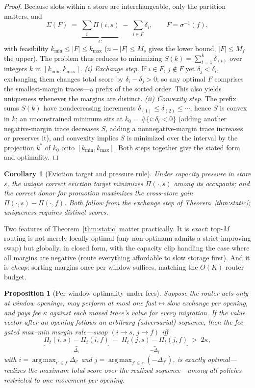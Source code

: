 \documentclass[10pt,twocolumn]{article}
\newtheorem{proposition}{Proposition}
\newtheorem{corollary}{Corollary}
\theoremstyle{definition}
\DeclareMathOperator{\argmax}{arg\,max}
\begin{document}
\begin{proof}
Because slots within a store are interchangeable, only the partition matters, and
\[
\Sigma(F)\;=\;\underbrace{\textstyle\sum_{i}\Pi(i,s)}_{C}\;-\;\sum_{i\in F}\delta_i ,
\qquad F=\sigma^{-1}(f),
\]
with feasibility $k_{\min}\le |F|\le k_{\max}$ ($n-|F|\le M_s$ gives the lower bound,
$|F|\le M_f$ the upper). The problem thus reduces to minimizing $S(k)=\sum_{t=1}^{k}\delta_{(t)}$ over
integers $k$ in $[k_{\min},k_{\max}]$. \emph{(i) Exchange step.} If $i\in F$, $j\notin F$ yet
$\delta_j<\delta_i$, exchanging them changes total score by $\delta_i-\delta_j>0$; so any optimal $F$
comprises the smallest-margin traces---a prefix of the sorted order. This also yields uniqueness whenever
the margins are distinct. \emph{(ii) Convexity step.} The prefix sums $S(k)$ have nondecreasing increments
$\delta_{(1)}\le\delta_{(2)}\le\cdots$, hence $S$ is convex in $k$; an unconstrained minimum sits at
$k_0=\#\{i:\delta_i<0\}$ (adding another negative-margin trace decreases $S$, adding a nonnegative-margin
trace increases or preserves it), and convexity implies $S$ is minimized over the interval by the projection
$k^{\ast}$ of $k_0$ onto $[k_{\min},k_{\max}]$. Both steps together give the stated form and optimality.
\end{proof}

\begin{corollary}[Eviction target and pressure rule]\label{cor:evict}
Under capacity pressure in store $s$, the unique correct eviction target minimizes $\Pi(\cdot,s)$ among its
occupants; and the correct donor for promotion maximizes the cross-store gain
$\Pi(\cdot,s)-\Pi(\cdot,f)$. Both follow from the exchange step of Theorem~\ref{thm:static}; uniqueness
requires distinct scores.
\end{corollary}

Two features of Theorem~\ref{thm:static} matter practically. It is \emph{exact}: top-$M$ routing is not
merely locally optimal (any non-optimum admits a strict improving swap) but globally, in closed form, with
the capacity clip handling the case where all margins are negative (route everything affordable to slow
storage first). And it is \emph{cheap}: sorting margins once per window suffices, matching the $O(K)$ router
budget.

\begin{proposition}[Per-window optimality under fees]\label{prop:dyn}
Suppose the router acts only at window openings, may perform at most one fast$\leftrightarrow$slow exchange
per opening, and pays fee $\kappa$ against each moved trace's value for every migration. If the value vector
after an opening follows an arbitrary (adversarial) sequence, then the fee-gated max--min margin rule---swap
$(i{\to}s,\,j{\to}f)$ iff
\[
\underbrace{\Pi_t(i,s)-\Pi_t(i,f)}_{\Delta_i}\;-\;\underbrace{\Pi_t(j,s)-\Pi_t(j,f)}_{-\Delta_j}\;>\;2\kappa,
\]
with $i=\argmax_{i'\in f}\Delta_{i'}$ and $j=\argmax_{j'\in s}(-\Delta_{j'})$, is exactly optimal---realizes
the maximum total score over the realized sequence---among all policies restricted to one movement per
opening.
\end{proposition}
\end{document}
